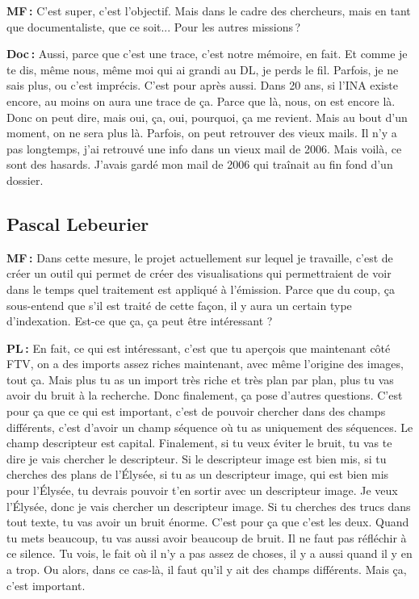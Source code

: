 \textbf{MF :} C'est super, c'est l'objectif. Mais dans le cadre des chercheurs, mais en tant que documentaliste, que ce soit...  Pour les autres missions ? 

\textbf{Doc :} Aussi, parce que c'est une trace, c'est notre mémoire, en fait.  Et comme je te dis, même nous, même moi qui ai grandi au DL, je perds le fil. Parfois, je ne sais plus, ou c’est imprécis. C'est pour après aussi. Dans 20 ans, si l'INA existe encore, au moins on aura une trace de ça.  Parce que là, nous, on est encore là. Donc on peut dire, mais oui, ça, oui, pourquoi, ça me revient. Mais au bout d'un moment, on ne sera plus là. Parfois, on peut retrouver des vieux mails. Il n'y a pas longtemps, j'ai retrouvé une info dans un vieux mail de 2006. Mais voilà, ce sont des hasards. J'avais gardé mon mail de 2006 qui traînait au fin fond d'un dossier.  

\subsection*{Pascal Lebeurier }

\textbf{MF :} Dans cette mesure, le projet actuellement sur lequel je travaille, c'est de créer un outil qui permet de créer des visualisations qui permettraient de voir dans le temps quel traitement est appliqué à l'émission. Parce que du coup, ça sous-entend que s'il est traité de cette façon, il y aura un certain type d'indexation. Est-ce que ça, ça peut être intéressant ? 

\textbf{PL :} En fait, ce qui est intéressant, c'est que tu aperçois que maintenant côté FTV, on a des imports assez riches maintenant, avec même l'origine des images, tout ça. Mais plus tu as un import très riche et très plan par plan, plus tu vas avoir du bruit à la recherche. Donc finalement, ça pose d'autres questions. C'est pour ça que ce qui est important, c'est de pouvoir chercher dans des champs différents, c'est d'avoir un champ séquence où tu as uniquement des séquences. Le champ descripteur est capital. Finalement, si tu veux éviter le bruit, tu vas te dire je vais chercher le descripteur. Si le descripteur image est bien mis, si tu cherches des plans de l'Élysée, si tu as un descripteur image, qui est bien mis pour l'Élysée, tu devrais pouvoir t'en sortir avec un descripteur image. Je veux l'Élysée, donc je vais chercher un descripteur image.  Si tu cherches des trucs dans tout texte, tu vas avoir un bruit énorme. C'est pour ça que c'est les deux. Quand tu mets beaucoup, tu vas aussi avoir beaucoup de bruit. Il ne faut pas réfléchir à ce silence. Tu vois, le fait où il n'y a pas assez de choses, il y a aussi quand il y en a trop. Ou alors, dans ce cas-là, il faut qu'il y ait des champs différents. Mais ça, c'est important. 

